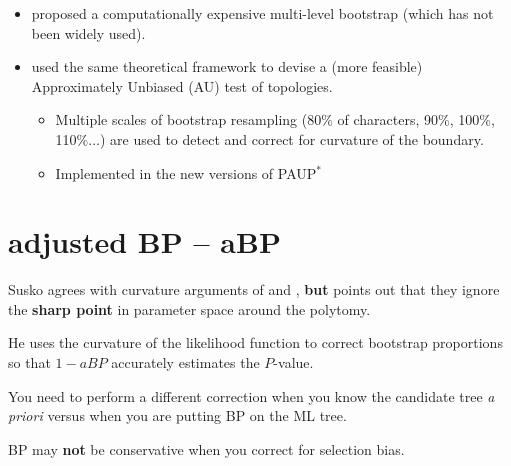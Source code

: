 \documentclass[landscape]{foils}
\begin{document}
\myNewSlide
\begin{itemize}
	\item \citet{EfronHH1996}  proposed a computationally expensive multi-level bootstrap (which has not been widely used).
	\item \citet{Shimodaira2002} used the same theoretical framework to devise a (more feasible) Approximately Unbiased (AU) test of topologies.
	\begin{itemize}
		\item Multiple scales of bootstrap resampling (80\% of characters, 90\%, 100\%, 110\%$\ldots$) are used to detect and correct for curvature of the boundary.
		\item Implemented in the new versions of PAUP$^{\ast}$
	\end{itemize}
\end{itemize}


\myNewSlide
\section*{\cite{Susko2010} adjusted BP -- aBP}
\large
Susko agrees with curvature arguments of \citet{EfronHH1996} and \citet{Shimodaira2002}, {\bf but} points out that they ignore the {\bf sharp point} in parameter space around the polytomy.

He uses the curvature of the likelihood function to correct bootstrap proportions so that $1-aBP$ accurately estimates the $P$-value.

You need to perform a different correction when you know the candidate tree {\em a priori} versus when you are putting BP on the ML tree.

BP may {\bf not} be conservative when you correct for selection bias.
\end{document}
